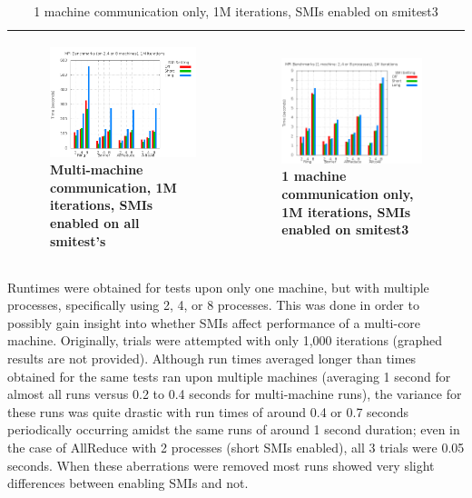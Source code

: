 \documentclass{IEEEtran}
\begin{document}
\begin{table}
\begin{tabular}{|p{}|p{}|}
  \begin{figure}[H]
  \includegraphics[keepaspectratio=true,width=240pt]{ss_graph3.png}
  \caption[cap3]{Multi-machine communication, 1M iterations, SMIs enabled on all smitest’s}
  \label{ss_graph3}
  \end{figure}
  & 
  \begin{figure}[H]
  \includegraphics[keepaspectratio=true,width=240pt]{ss_graph4.png}
  \caption[cap4]{1 machine communication only, 1M iterations, SMIs enabled on smitest3}
  \label{ss_graph4}
  \end{figure}\\
  \hline
\end{tabular}
\end{table}

Runtimes were obtained for tests upon only one machine, but with multiple processes, specifically using 2, 4, or 8 processes. This was done in order to possibly gain insight into whether SMIs affect performance of a multi-core machine. Originally, trials were attempted with only 1,000 iterations (graphed results are not provided). Although run times averaged longer than times obtained for the same tests ran upon multiple machines (averaging 1 second for almost all runs versus 0.2 to 0.4 seconds for multi-machine runs), the variance for these runs was quite drastic with run times of around 0.4 or 0.7 seconds periodically occurring amidst the same runs of around 1 second duration; even in the case of AllReduce with 2 processes (short SMIs enabled), all 3 trials were 0.05 seconds. When these aberrations were removed most runs showed very slight differences between enabling SMIs and not.
\end{document}
